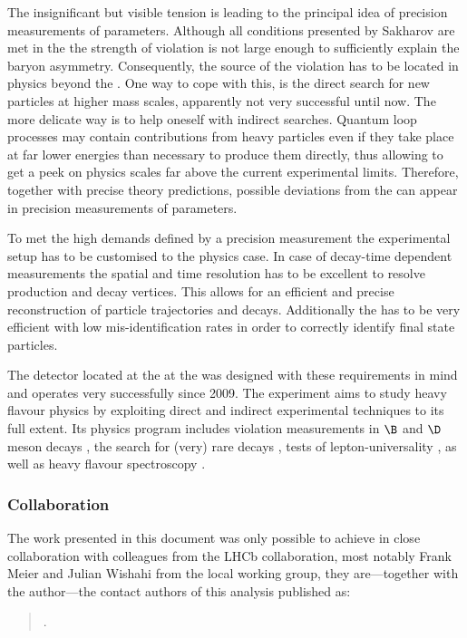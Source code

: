 The insignificant but visible tension is leading to the principal idea of
precision measurements of \CKM parameters. Although all conditions presented by
Sakharov are met in the \SM the strength of \CP violation is not large enough to
sufficiently explain the baryon asymmetry. Consequently, the source of the \CP
violation has to be located in physics beyond the \SM. One way to cope with
this, is the direct search for new particles at higher mass scales, apparently
not very successful until now. The more delicate way is to help oneself with
indirect searches. Quantum loop processes may contain contributions from heavy
particles even if they take place at far lower energies than necessary to
produce them directly, thus allowing to get a peek on physics scales far above
the current experimental limits. Therefore, together with precise theory
predictions, possible deviations from the \SM can appear in precision
measurements of \SM parameters.

To met the high demands defined by a precision measurement the experimental
setup has to be customised to the physics case. In case of decay-time dependent
measurements the spatial and time resolution has to be excellent to resolve
production and decay vertices. This allows for an efficient and precise
reconstruction of particle trajectories and decays. Additionally the \PID has to
be very efficient with low mis-identification rates in order to correctly
identify final state particles.

The \LHCb detector located at the \LHC at the \CERN was designed with these
requirements in mind and operates very successfully since 2009. The \LHCb
experiment aims to study heavy flavour physics by exploiting direct and indirect
experimental techniques to its full extent. Its physics program includes \CP
violation measurements in $\B$ and $\D$ meson decays
\cite{Aaij:2015tza,Aaij:2015yda,Aaij:2014uva,Aaij:2014fba,Aaij:2014dka,Aaij:2014zsa,Aaij:2014kxa}, 
the search for (very) rare decays \cite{CMS:2014xfa}, tests of
lepton-universality \cite{Aaij:2014ora,Aaij:2015yra}, as well as heavy flavour
spectroscopy \cite{Aaij:2014yka,Aaij:2015tga}.

\subsubsection*{Collaboration}
The work presented in this document was only possible to achieve in close
collaboration with colleagues from the \acs{LHCb} collaboration, most notably
Frank Meier and Julian Wishahi from the local working group, they are---together
with the author---the contact authors of this analysis published as:
%
\begin{quotation}
  .
\end{quotation}

